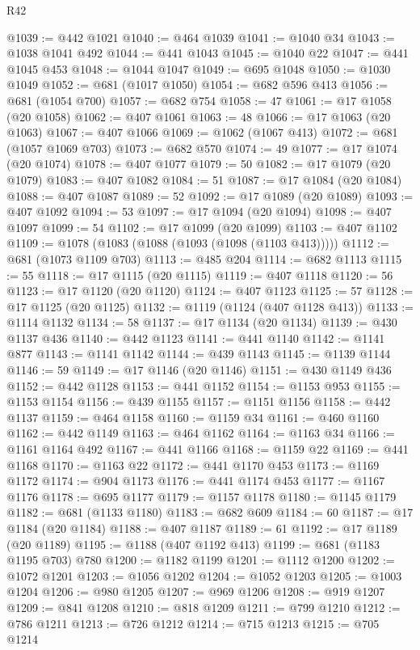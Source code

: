 \begin{lexlean}{R42}
\begin{coremodule}
@1039 := @442 @1021
@1040 := @464 @1039
@1041 := @1040 @34
@1043 := @1038 @1041 @492
@1044 := @441 @1043
@1045 := @1040 @22
@1047 := @441 @1045 @453
@1048 := @1044 @1047
@1049 := @695 @1048
@1050 := @1030 @1049
@1052 := @681 (@1017 @1050)
@1054 := @682 @596 @413
@1056 := @681 (@1054 @700)
@1057 := @682 @754
@1058 := 47
@1061 := @17 @1058 (@20 @1058)
@1062 := @407 @1061
@1063 := 48
@1066 := @17 @1063 (@20 @1063)
@1067 := @407 @1066
@1069 := @1062 (@1067 @413)
@1072 := @681 (@1057 @1069 @703)
@1073 := @682 @570
@1074 := 49
@1077 := @17 @1074 (@20 @1074)
@1078 := @407 @1077
@1079 := 50
@1082 := @17 @1079 (@20 @1079)
@1083 := @407 @1082
@1084 := 51
@1087 := @17 @1084 (@20 @1084)
@1088 := @407 @1087
@1089 := 52
@1092 := @17 @1089 (@20 @1089)
@1093 := @407 @1092
@1094 := 53
@1097 := @17 @1094 (@20 @1094)
@1098 := @407 @1097
@1099 := 54
@1102 := @17 @1099 (@20 @1099)
@1103 := @407 @1102
@1109 := @1078 (@1083 (@1088 (@1093 (@1098 (@1103 @413)))))
@1112 := @681 (@1073 @1109 @703)
@1113 := @485 @204
@1114 := @682 @1113
@1115 := 55
@1118 := @17 @1115 (@20 @1115)
@1119 := @407 @1118
@1120 := 56
@1123 := @17 @1120 (@20 @1120)
@1124 := @407 @1123
@1125 := 57
@1128 := @17 @1125 (@20 @1125)
@1132 := @1119 (@1124 (@407 @1128 @413))
@1133 := @1114 @1132
@1134 := 58
@1137 := @17 @1134 (@20 @1134)
@1139 := @430 @1137 @436
@1140 := @442 @1123
@1141 := @441 @1140
@1142 := @1141 @877
@1143 := @1141 @1142
@1144 := @439 @1143
@1145 := @1139 @1144
@1146 := 59
@1149 := @17 @1146 (@20 @1146)
@1151 := @430 @1149 @436
@1152 := @442 @1128
@1153 := @441 @1152
@1154 := @1153 @953
@1155 := @1153 @1154
@1156 := @439 @1155
@1157 := @1151 @1156
@1158 := @442 @1137
@1159 := @464 @1158
@1160 := @1159 @34
@1161 := @460 @1160
@1162 := @442 @1149
@1163 := @464 @1162
@1164 := @1163 @34
@1166 := @1161 @1164 @492
@1167 := @441 @1166
@1168 := @1159 @22
@1169 := @441 @1168
@1170 := @1163 @22
@1172 := @441 @1170 @453
@1173 := @1169 @1172
@1174 := @904 @1173
@1176 := @441 @1174 @453
@1177 := @1167 @1176
@1178 := @695 @1177
@1179 := @1157 @1178
@1180 := @1145 @1179
@1182 := @681 (@1133 @1180)
@1183 := @682 @609
@1184 := 60
@1187 := @17 @1184 (@20 @1184)
@1188 := @407 @1187
@1189 := 61
@1192 := @17 @1189 (@20 @1189)
@1195 := @1188 (@407 @1192 @413)
@1199 := @681 (@1183 @1195 @703) @780
@1200 := @1182 @1199
@1201 := @1112 @1200
@1202 := @1072 @1201
@1203 := @1056 @1202
@1204 := @1052 @1203
@1205 := @1003 @1204
@1206 := @980 @1205
@1207 := @969 @1206
@1208 := @919 @1207
@1209 := @841 @1208
@1210 := @818 @1209
@1211 := @799 @1210
@1212 := @786 @1211
@1213 := @726 @1212
@1214 := @715 @1213
@1215 := @705 @1214

\end{coremodule}
\end{lexlean}
